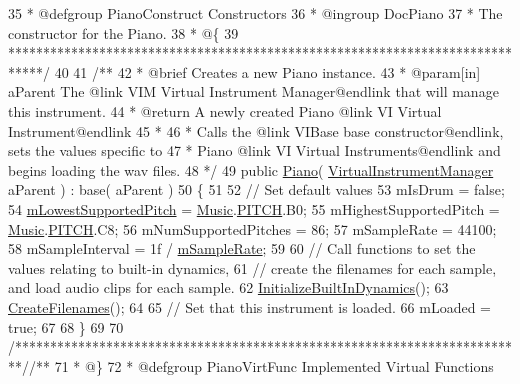 \begin{DoxyCodeInclude}
35 \textcolor{comment}{     * @defgroup PianoConstruct Constructors}
36 \textcolor{comment}{     * @ingroup DocPiano}
37 \textcolor{comment}{     * The constructor for the Piano.}
38 \textcolor{comment}{     * @\{}
39 \textcolor{comment}{    *****************************************************************************/}
40 \textcolor{comment}{}
41 \textcolor{comment}{    /**}
42 \textcolor{comment}{     * @brief Creates a new Piano instance.}
43 \textcolor{comment}{     * @param[in] aParent The @link VIM Virtual Instrument Manager@endlink that will manage this
       instrument.}
44 \textcolor{comment}{     * @return A newly created Piano @link VI Virtual Instrument@endlink}
45 \textcolor{comment}{     * }
46 \textcolor{comment}{     * Calls the @link VIBase base constructor@endlink, sets the values specific to }
47 \textcolor{comment}{     * Piano @link VI Virtual Instruments@endlink and begins loading the wav files.}
48 \textcolor{comment}{    */}
49     \textcolor{keyword}{public} \hyperlink{group___piano_construct_ga5128747ca1a1fbdc94a78362d3b87eed}{Piano}( \hyperlink{class_virtual_instrument_manager}{VirtualInstrumentManager} aParent ) : base( aParent )
50     \{
51 
52         \textcolor{comment}{// Set default values}
53         mIsDrum = \textcolor{keyword}{false};
54         \hyperlink{group___v_i_base_pro_var_ga3cae52b1bcc0178a8a6b03c7aaf7aac8}{mLowestSupportedPitch} = \hyperlink{class_music}{Music}.\hyperlink{group___music_enums_ga508f69b199ea518f935486c990edac1d}{PITCH}.B0;
55         mHighestSupportedPitch = \hyperlink{class_music}{Music}.\hyperlink{group___music_enums_ga508f69b199ea518f935486c990edac1d}{PITCH}.C8;
56         mNumSupportedPitches = 86;
57         mSampleRate = 44100;
58         mSampleInterval = 1f / \hyperlink{group___v_i_base_pro_var_ga80b3d2ff29b27698eea6bcf2f8ddc5d7}{mSampleRate};
59 
60         \textcolor{comment}{// Call functions to set the values relating to built-in dynamics, }
61         \textcolor{comment}{// create the filenames for each sample, and load audio clips for each sample.}
62         \hyperlink{group___piano_virt_func_ga6bc02528f8808b8a30aa7d5776445a6d}{InitializeBuiltInDynamics}();
63         \hyperlink{group___piano_virt_func_gaafd50f0f04ea7ea4f560accc628b8f1b}{CreateFilenames}();
64 
65         \textcolor{comment}{// Set that this instrument is loaded.}
66         mLoaded = \textcolor{keyword}{true};
67 
68     \}
69 
70     \textcolor{comment}{/*************************************************************************/}\textcolor{comment}{/** }
71 \textcolor{comment}{     * @\}}
72 \textcolor{comment}{     * @defgroup PianoVirtFunc Implemented Virtual Functions}

\end{DoxyCodeInclude}
